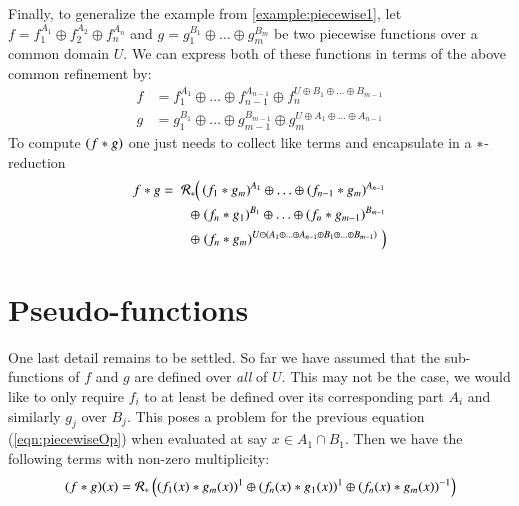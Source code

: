 Finally, to generalize the example from \ref{example:piecewise1}, let $f = f_1^{A_1} \oplus f_2^{A_2} \oplus f_n^{A_n}$
and  $g = g_1^{B_1} \oplus \ldots \oplus g_m^{B_m}$ be two piecewise functions over a common domain $U$.
We can express both of these functions in terms of the above common refinement by:
\begin{align*}
	f &= f_1^{A_1} \oplus \ldots \oplus f_{n-1}^{A_{n-1}} \oplus f_n^{U \oplus B_1 \oplus \ldots \oplus B_{m-1}} \\
	g &= g_1^{B_1} \oplus\ldots \oplus g_{m-1}^{B_{m-1}} \oplus g_m^{U \oplus A_1 \oplus\ldots \oplus A_{n-1}}
\end{align*}
To compute $(f * g)$ one just needs to collect like terms and encapsulate in a $*$-reduction
\begin{align}
	\label{eqn:piecewiseOp}
	f * g = \; \mathcal{R}_*  \; & \!\!\! \left( \,
			(f_1 * g_m)^{A_1} 
			\oplus \ldots \oplus 
			 (f_{n-1} * g_m)^{A_{n-1}} \right. \notag \\
		\oplus & \;
			 (f_n * g_1)^{B_1} 
			\oplus \ldots \oplus 
			 (f_n * g_{m-1})^{B_{m-1}} \\
		\oplus & \left. 
			 (f_n * g_m)^{U \ominus (A_1 \oplus \ldots \oplus A_{n-1} \oplus B_1 \oplus \ldots \oplus B_{m-1})}
		\; \right) \notag
\end{align}

  
  



%
%
\section{Pseudo-functions}


One last detail remains to be settled.
So far we have assumed that the sub-functions of $f$ and $g$ are defined over \emph{all} of $U$.
This may not be the case, we would like to only require $f_i$ to at least be defined over its corresponding part $A_i$
and similarly $g_j$ over $B_j$.
This poses a problem for the previous equation (\ref{eqn:piecewiseOp}) when evaluated at say $x \in A_1 \cap B_1$.
Then we have the following terms with non-zero multiplicity:
\begin{equation*}
	(f * g)(x) = 
		\mathcal{R}_* \left(   
			(f_1(x) * g_m(x))^1 \oplus 
			(f_n(x) * g_1(x))^1 \oplus 
			(f_n(x) * g_m(x))^{-1} 
		\right)
\end{equation*}



